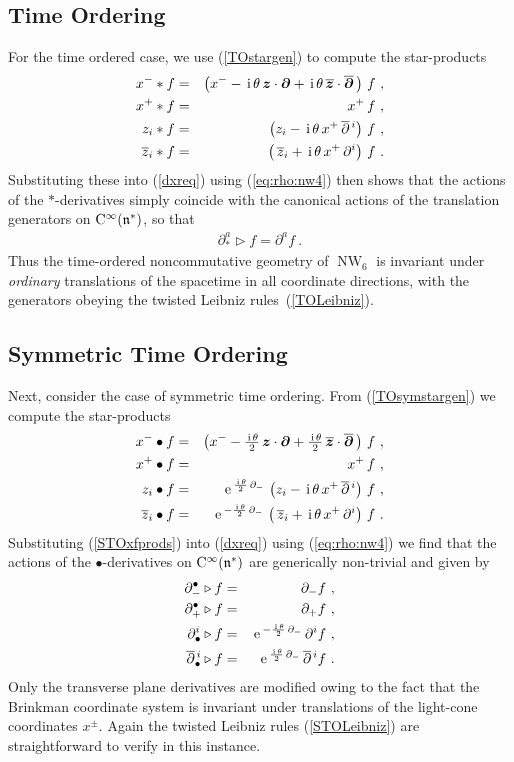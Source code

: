 \documentclass[11pt,a4paper]{article}
\DeclareMathOperator{\NW}{NW}
\newcommand{\mbf}[1]{{\boldsymbol {#1} }}
\def\ii{{\,{\rm i}\,}}
\def\CC{{\rm C}}
\def\mz{{\mbf z}}
\def\mdell{{\mbf\partial}}
\def\mfn{{\mathfrak n}}
\def\e{{\,\rm e}\,}
\def\bea{\begin{eqnarray}}
\def\eea{\end{eqnarray}}
\newcommand{\beq}{\begin{eqnarray}}
\newcommand{\eeq}{\end{eqnarray}}
\begin{document}
\subsection{Time Ordering \label{TOderiv}}

For the time ordered case, we use (\ref{TOstargen}) to compute the
star-products
\bea
x^-*f&=&\left(x^--\ii\theta\,\mz\cdot\mdell+\ii\theta\,
\overline{\mz}\cdot\overline{\mdell}\,\right)\,f \ , \nonumber\\
x^+*f&=&x^+\,f \ , \nonumber\\
z_i*f&=&\left(z_i-\ii\theta\,x^+\,\overline{\partial}{}^{\,i}
\right)\, f \ , \nonumber\\
\overline{z}_i*f&=&\left(\,\overline{z}_i+\ii\theta\,x^+\,\partial^i
\right)\,f \ .
\label{TOxfprods}\eea
Substituting these into (\ref{dxreq}) using (\ref{eq:rho:nw4}) then
shows that the actions of the $*$-derivatives simply coincide with the
canonical actions of the translation generators on
$\CC^\infty(\mfn^*)$, so that
\beq
\partial_*^a\triangleright f=\partial^af \ .
\label{TOderivs}\eeq
Thus the time-ordered noncommutative geometry of $\NW_6$ is invariant
under {\it ordinary} translations of the spacetime in all coordinate
directions, with the generators obeying the twisted Leibniz
rules~(\ref{TOLeibniz}).

\subsection{Symmetric Time Ordering \label{STOderiv}}

Next, consider the case of symmetric time ordering. From
(\ref{TOsymstargen}) we compute the star-products
\bea
x^-\bullet f&=&\left(x^--\mbox{$\frac{\ii\theta}2$}\,
\mz\cdot\mdell+\mbox{$\frac{\ii\theta}2$}\,\overline{\mz}
\cdot\overline{\mdell}\,\right)\,f \ , \nonumber\\
x^+\bullet f&=&x^+\,f \ , \nonumber\\
z_i\bullet f&=&\e^{\frac{\ii\theta}2\,\partial_-}\,
\left(z_i-\ii\theta\,x^+\,\overline{\partial}{}^{\,i}
\right)\,f  \ , \nonumber\\
\overline{z}_i\bullet f&=&\e^{-\frac{\ii\theta}2\,\partial_-}\,
\left(\,\overline{z}_i+\ii\theta\,
x^+\,\partial^i\right)\,f \ .
\label{STOxfprods}\eea
Substituting (\ref{STOxfprods}) into (\ref{dxreq}) using
(\ref{eq:rho:nw4}) we find that the actions of the
$\bullet$-derivatives on $\CC^\infty(\mfn^*)$ are generically
non-trivial and given by
\bea
\partial_-^\bullet\triangleright f&=&\partial_-f \ , \nonumber\\
\partial_+^\bullet\triangleright f&=&\partial_+f \ , \nonumber\\
\partial^i_\bullet\triangleright f&=&\e^{-\frac{\ii\theta}2\,
\partial_-}\,\partial^if \ , \nonumber\\
\overline{\partial}{}^{\,i}_\bullet\triangleright f&=&
\e^{\frac{\ii\theta}2\,\partial_-}\,
\overline{\partial}{}^{\,i}f \ .
\label{STOderivs}\eea
Only the transverse plane derivatives are modified owing to the fact
that the Brinkman coordinate system is invariant under translations of
the light-cone coordinates $x^\pm$. Again the twisted Leibniz rules
(\ref{STOLeibniz}) are straightforward to verify in this instance.
\end{document}
